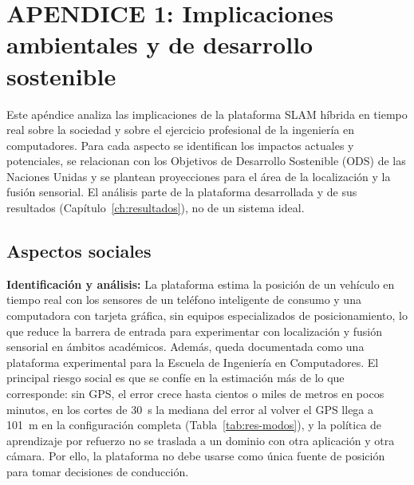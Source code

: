 
\chapter{APENDICE 1: Implicaciones ambientales y de desarrollo sostenible}
\label{appendix:apendiceA}

Este apéndice analiza las implicaciones de la plataforma SLAM híbrida en tiempo real sobre la sociedad y sobre el ejercicio profesional de la ingeniería en computadores.
Para cada aspecto se identifican los impactos actuales y potenciales, se relacionan con los Objetivos de Desarrollo Sostenible (ODS) de las Naciones Unidas \cite{onu2015agenda2030} y se plantean proyecciones para el área de la localización y la fusión sensorial.
El análisis parte de la plataforma desarrollada y de sus resultados (Capítulo~\ref{ch:resultados}), no de un sistema ideal.

\section{Aspectos sociales}

\textbf{Identificación y análisis:}
La plataforma estima la posición de un vehículo en tiempo real con los sensores de un teléfono inteligente de consumo y una computadora con tarjeta gráfica, sin equipos especializados de posicionamiento, lo que reduce la barrera de entrada para experimentar con localización y fusión sensorial en ámbitos académicos.
Además, queda documentada como una plataforma experimental para la Escuela de Ingeniería en Computadores.
El principal riesgo social es que se confíe en la estimación más de lo que corresponde: sin GPS, el error crece hasta cientos o miles de metros en pocos minutos, en los cortes de 30~s la mediana del error al volver el GPS llega a 101~m en la configuración completa (Tabla~\ref{tab:res-modos}), y la política de aprendizaje por refuerzo no se traslada a un dominio con otra aplicación y otra cámara.
Por ello, la plataforma no debe usarse como única fuente de posición para tomar decisiones de conducción.

